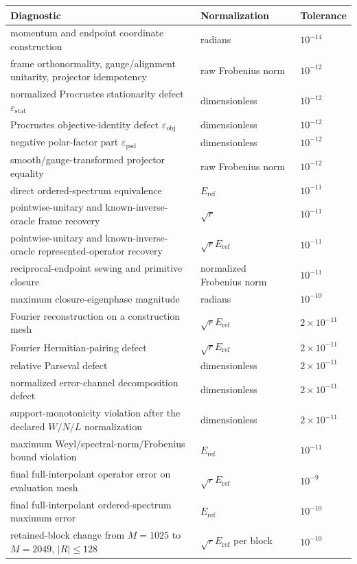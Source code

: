 \documentclass[11pt]{article}
\begin{document}
\begin{center}\small
\begin{tabularx}{\textwidth}{YYY}
\toprule
\textbf{Diagnostic} & \textbf{Normalization} & \textbf{Tolerance} \\
\midrule
momentum and endpoint coordinate construction & radians & $10^{-14}$ \\
frame orthonormality, gauge/alignment unitarity, projector idempotency & raw Frobenius norm & $10^{-12}$ \\
normalized Procrustes stationarity defect $\varepsilon_{\mathrm{stat}}$ & dimensionless & $10^{-12}$ \\
Procrustes objective-identity defect $\varepsilon_{\mathrm{obj}}$ & dimensionless & $10^{-12}$ \\
negative polar-factor part $\varepsilon_{\mathrm{psd}}$ & dimensionless & $10^{-12}$ \\
smooth/gauge-transformed projector equality & raw Frobenius norm & $10^{-12}$ \\
direct ordered-spectrum equivalence & $E_{\mathrm{ref}}$ & $10^{-11}$ \\
pointwise-unitary and known-inverse-oracle frame recovery & $\sqrt r$ & $10^{-11}$ \\
pointwise-unitary and known-inverse-oracle represented-operator recovery & $\sqrt rE_{\mathrm{ref}}$ & $10^{-11}$ \\
reciprocal-endpoint sewing and primitive closure & normalized Frobenius norm & $10^{-11}$ \\
maximum closure-eigenphase magnitude & radians & $10^{-10}$ \\
Fourier reconstruction on a construction mesh & $\sqrt rE_{\mathrm{ref}}$ & $2\times10^{-11}$ \\
Fourier Hermitian-pairing defect & $\sqrt rE_{\mathrm{ref}}$ & $2\times10^{-11}$ \\
relative Parseval defect & dimensionless & $2\times10^{-11}$ \\
normalized error-channel decomposition defect & dimensionless & $2\times10^{-11}$ \\
support-monotonicity violation after the declared $W/N/L$ normalization & dimensionless & $2\times10^{-11}$ \\
maximum Weyl/spectral-norm/Frobenius bound violation & $E_{\mathrm{ref}}$ & $10^{-11}$ \\
final full-interpolant operator error on evaluation mesh & $\sqrt rE_{\mathrm{ref}}$ & $10^{-9}$ \\
final full-interpolant ordered-spectrum maximum error & $E_{\mathrm{ref}}$ & $10^{-10}$ \\
retained-block change from $M=1025$ to $M=2049$, $\lvert R\rvert\leq128$ & $\sqrt rE_{\mathrm{ref}}$ per block & $10^{-10}$ \\
\bottomrule
\end{tabularx}
\end{center}
\end{document}
